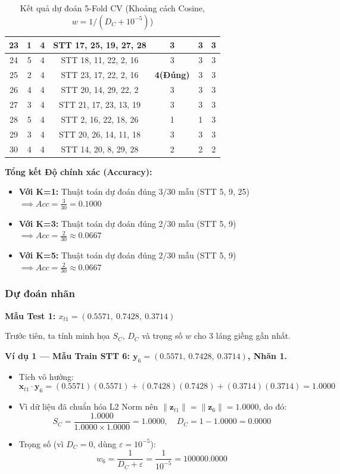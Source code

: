 \documentclass[12pt,a4paper]{article}
\begin{document}
\begin{table}[H]
\begin{tabular}{|c|c|c|c|c|c|c|}
23 & 1 & 4 & STT 17, 25, 19, 27, 28 & 3 & 3 & 3 \\ \hline
24 & 5 & 4 & STT 18, 11, 22, 2, 16 & 3 & 3 & 3 \\ \hline
25 & 2 & 4 & STT 23, 17, 22, 2, 16 & \textbf{4(Đúng)} & 3 & 3 \\ \hline
26 & 4 & 4 & STT 20, 14, 29, 22, 2 & 3 & 3 & 3 \\ \hline
27 & 3 & 4 & STT 21, 17, 23, 13, 19 & 3 & 3 & 3 \\ \hline
28 & 5 & 4 & STT 2, 16, 22, 18, 26 & 1 & 1 & 3 \\ \hline
29 & 3 & 4 & STT 20, 26, 14, 11, 18 & 3 & 3 & 3 \\ \hline
30 & 4 & 4 & STT 14, 20, 8, 29, 28 & 2 & 2 & 2 \\ \hline
\end{tabular}
\caption{Kết quả dự đoán 5-Fold CV (Khoảng cách Cosine, $w = 1/(D_C + 10^{-5})$)}
\end{table}

\textbf{Tổng kết Độ chính xác (Accuracy):}
\begin{itemize}
    \item \textbf{Với K=1:} Thuật toán dự đoán đúng 3/30 mẫu (STT 5, 9, 25) $\implies Acc = \frac{3}{30} = 0.1000$
    \item \textbf{Với K=3:} Thuật toán dự đoán đúng 2/30 mẫu (STT 5, 9) $\implies Acc = \frac{2}{30} \approx 0.0667$
    \item \textbf{Với K=5:} Thuật toán dự đoán đúng 2/30 mẫu (STT 5, 9) $\implies Acc = \frac{2}{30} \approx 0.0667$
\end{itemize}
\subsubsection{Dự đoán nhãn}
\textbf{Mẫu Test 1: $x_{t1} = (0.5571,\ 0.7428,\ 0.3714)$}
 
\vspace{0.3cm}
Trước tiên, ta tính minh họa $S_C$, $D_C$ và trọng số $w$ cho 3 láng giềng gần nhất.
 
\vspace{0.3cm}
\textbf{Ví dụ 1 — Mẫu Train STT 6: $\mathbf{y}_6 = (0.5571,\ 0.7428,\ 0.3714)$, Nhãn 1.}
\begin{itemize}
    \item Tích vô hướng:
    \[
        \mathbf{x}_{t1} \cdot \mathbf{y}_6
        = (0.5571)(0.5571) + (0.7428)(0.7428) + (0.3714)(0.3714) = 1.0000
    \]
    \item Vì dữ liệu đã chuẩn hóa L2 Norm nên $\|\mathbf{z}_{t1}\| = \|\mathbf{z}_6\| = 1.0000$, do đó:
    \[
        S_C = \frac{1.0000}{1.0000 \times 1.0000} = 1.0000, \quad
        D_C = 1 - 1.0000 = 0.0000
    \]
    \item Trọng số (vì $D_C = 0$, dùng $\varepsilon = 10^{-5}$):
    \[
        w_6 = \frac{1}{D_C + \varepsilon} = \frac{1}{10^{-5}} = 100000.0000
    \]
\end{itemize}
 
\end{document}
